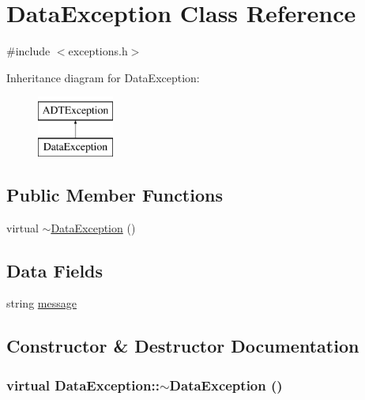 \hypertarget{classDataException}{
\section{DataException Class Reference}
\label{classDataException}
}


{\ttfamily \#include $<$exceptions.h$>$}

Inheritance diagram for DataException:\begin{figure}[H]
\begin{center}
\leavevmode
\includegraphics[height=2cm]{classDataException}
\end{center}
\end{figure}
\subsection*{Public Member Functions}
\begin{DoxyCompactItemize}
\item 
virtual \hyperlink{classDataException_a78bbe639df04f97e992fbbdc77f5fc25}{$\sim$DataException} ()
\end{DoxyCompactItemize}
\subsection*{Data Fields}
\begin{DoxyCompactItemize}
\item 
string \hyperlink{classDataException_a8cac3128f4a8d7749d2ffcefa0726aee}{message}
\end{DoxyCompactItemize}


\subsection{Constructor \& Destructor Documentation}
\hypertarget{classDataException_a78bbe639df04f97e992fbbdc77f5fc25}{
\subsubsection[{$\sim$DataException}]{\setlength{\rightskip}{0pt plus 5cm}virtual DataException::$\sim$DataException ()}}
\label{classDataException_a78bbe639df04f97e992fbbdc77f5fc25}


